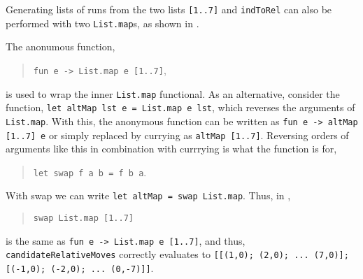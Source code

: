 \documentclass[fsharpnotes.tex]{subfiles}
\begin{document}
Generating lists of runs from the two lists \lstinline{[1..7]} and \lstinline{indToRel} can also be performed with two \lstinline{List.map}s, as shown in .

\begin{comment}
As an example, consider the list of string-concatenations of every combination of \lstinline{["a","b"]} and \lstinline{["1"; "2"; "3"]}, i.e., \lstinline{["a1"; "a2"; "a3"; "b1"; "b2"; "b3"]}. For the first element in the letter-list, this can be hard-coded as
\begin{quote}
\lstinline{List.map (fun d -> "a"+d) ["1"; "2"; "3"]},
\end{quote}
which produces \lstinline{["a1"; "a2"; "a3"]}. Using an outer \lstinline{List.map} iterating over all letters looks like:
\begin{quote}
\lstinline{List.map (fun l -> List.map (fun d -> l+d) ["1";"2";"3"]) ["a"; "b"]},
\end{quote}
which produces \lstinline{[a1"; a2"; "a3"; "b1"; "b2"; "b3"]}.

The code for \lstinline{candidateRelativeMoves}, shown in \Cref{pieces}, is similar in spirit to the letter and digit example above, but is further complicated by the fact that \lstinline{indToRel} is a list of functions.
\end{comment}
%
%
The anonumous function,
\begin{quote}
\lstinline{fun e -> List.map e [1..7]},
\end{quote}
is used to wrap the inner \lstinline{List.map} functional. As an alternative, consider the function, \lstinline{let altMap lst e = List.map e lst}, which reverses the arguments of \lstinline{List.map}. With this, the anonymous function can be written as \lstinline{fun e -> altMap [1..7] e} or simply replaced by currying as \lstinline{altMap [1..7]}. Reversing orders of arguments like this in combination with currrying is what the  function is for,
\begin{quote}
\lstinline{let swap f a b = f b a}.
\end{quote}
With swap we can write \lstinline{let altMap = swap List.map}. Thus, in ,
\begin{quote}
\lstinline{swap List.map [1..7]}
\end{quote}
is the same as \lstinline{fun e -> List.map e [1..7]}, and thus, \lstinline{candidateRelativeMoves} correctly evaluates to \lstinline{[[(1,0); (2,0); ... (7,0)]; [(-1,0); (-2,0); ... (0,-7)]]}.
\end{document}
